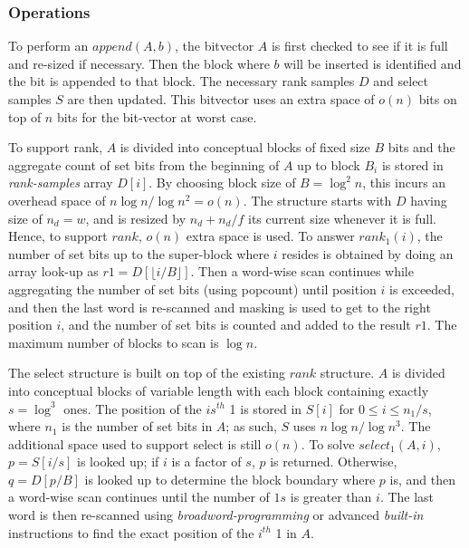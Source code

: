 \subsubsection{Operations}
To perform an $append(A, b)$, the bitvector $A$ is first checked to see if it is full and re-sized if necessary. Then the block where $b$ will be inserted is identified and the bit is appended to that block. The necessary rank samples $D$ and select samples $S$ are then updated. This bitvector uses an extra space of $o(n)$ bits on top of $n$ bits for the bit-vector at worst case.\par

To support rank, $A$ is divided into conceptual blocks of fixed size $B$ bits and the aggregate count of set bits from the beginning of $A$ up to block $B_i$ is stored in \textit{rank-samples} array $D[i]$. By choosing block size of $B=\log^2 n$, this incurs an overhead space of $n\log n/\log n^2 = o(n)$. The structure starts with $D$ having size of $n_d = w$, and is resized by $n_d + n_d/f$ its current size whenever it is full. Hence, to support $rank$, $o(n)$ extra space is used. To answer $rank_1(i)$, the number of set bits up to the super-block where $i$ resides is obtained by doing an array look-up as $r1 = D[\lfloor i/B \rfloor]$. Then a word-wise scan continues while aggregating the number of set bits (using popcount) until position $i$ is exceeded, and then the last word is re-scanned and masking is used to get to the right position $i$, and the number of set bits is counted and added to the result $r1$. The maximum number of blocks to scan is $\log n$.\par
The select structure is built on top of the existing $rank$ structure. $A$ is divided into conceptual blocks of variable length with each block containing exactly $s=\log^3$ ones. The position of the $is^{th}$ 1 is stored in $S[i]$ for $0 \leq i \leq n_1/s$, where $n_1$ is the number of set bits in $A$; as such, $S$ uses $n\log n/\log n^3$. The additional space used to support select is still $o(n)$. To solve $select_1(A, i)$, $p = S[i/s]$ is looked up; if $i$ is a factor of $s$, $p$ is returned. Otherwise, $q = D[p/B]$ is looked up to determine the block boundary where $p$ is, and then a word-wise scan continues until the number of $1s$ is greater than $i$. The last word is then re-scanned using \textit{broadword-programming} or advanced \textit{built-in} instructions to find the exact position of the $i^{th}$ 1 in $A$. 
